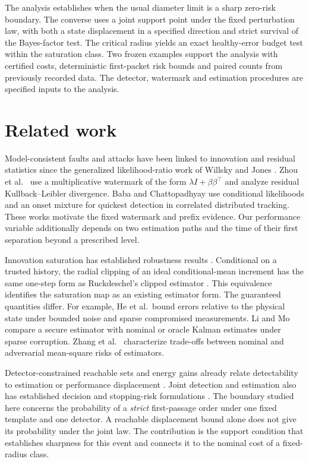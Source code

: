 \documentclass[preprint,11pt]{elsarticle}
\begin{document}
The analysis establishes when the usual diameter limit is a sharp zero-risk boundary. The converse uses a joint support point under the fixed perturbation law, with both a state displacement in a specified direction and strict survival of the Bayes-factor test. The critical radius yields an exact healthy-error budget test within the saturation class. Two frozen examples support the analysis with certified costs, deterministic first-packet risk bounds and paired counts from previously recorded data. The detector, watermark and estimation procedures are specified inputs to the analysis.

\section{Related work}

Model-consistent faults and attacks have been linked to innovation and residual statistics since the generalized likelihood-ratio work of Willsky and Jones \cite{willsky}. Zhou et al.\ \cite{zhou} use a multiplicative watermark of the form \(\lambda I+\beta\beta^\top\) and analyze residual Kullback--Leibler divergence. Baba and Chattopadhyay \cite{baba} use conditional likelihoods and an onset mixture for quickest detection in correlated distributed tracking. These works motivate the fixed watermark and prefix evidence. Our performance variable additionally depends on two estimation paths and the time of their first separation beyond a prescribed level.

Innovation saturation has established robustness results \cite{he}. Conditional on a trusted history, the radial clipping of an ideal conditional-mean increment has the same one-step form as Ruckdeschel's clipped estimator \cite[Theorem 3.2]{ruck}. This equivalence identifies the saturation map as an existing estimator form. The guaranteed quantities differ. For example, He et al.\ bound errors relative to the physical state under bounded noise and sparse compromised measurements. Li and Mo \cite{limo} compare a secure estimator with nominal or oracle Kalman estimates under sparse corruption. Zhang et al.\ \cite{lee} characterize trade-offs between nominal and adversarial mean-square risks of estimators.

Detector-constrained reachable sets and energy gains already relate detectability to estimation or performance displacement \cite{murguia,gallo}. Joint detection and estimation also has established decision and stopping-risk formulations \cite{sihag,yilmaz}. The boundary studied here concerns the probability of a \emph{strict} first-passage order under one fixed template and one detector. A reachable displacement bound alone does not give its probability under the joint law. The contribution is the support condition that establishes sharpness for this event and connects it to the nominal cost of a fixed-radius class.
\end{document}

